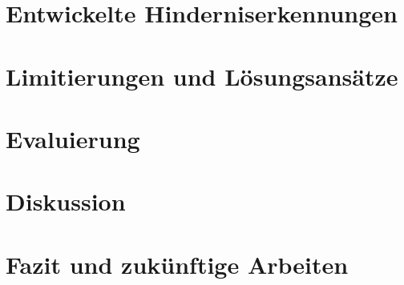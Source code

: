 \documentclass[pdftex,12pt,a4paper]{report}
\begin{document}

\chapter{Entwickelte Hinderniserkennungen}
\label{chp:developed_algorithms}



\chapter{Limitierungen und Lösungsansätze}
\label{chp:conflicts}



\chapter{Evaluierung}
\label{chp:evaluation}



\chapter{Diskussion}
\label{chp:discussion}



\chapter{Fazit und zukünftige Arbeiten}
\label{chp:fazit}




\appendix






    


\nocite{zureiki2008stereo}
\nocite{opencvoreilly}
\nocite{cyganek2011introduction}

\end{document}
